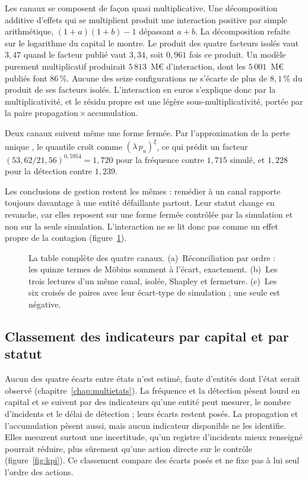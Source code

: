 Les canaux se composent de façon quasi multiplicative. Une décomposition additive d'effets qui se
multiplient produit une interaction positive par simple arithmétique, $(1+a)(1+b)-1$ dépassant $a+b$.
La décomposition refaite sur le logarithme du capital le montre. Le produit des quatre facteurs isolés
vaut $3{,}47$ quand le facteur publié vaut $3{,}34$, soit $0{,}961$ fois ce produit. Un modèle
purement multiplicatif produirait $5\,813$~M\euro{} d'interaction, dont les $5\,001$~M\euro{} publiés
font $86\,\%$. Aucune des seize configurations ne s'écarte de plus de $8{,}1\,\%$ du produit de ses
facteurs isolés. L'interaction en euros s'explique donc par la multiplicativité, et le résidu propre est
une légère sous-multiplicativité, portée par la paire propagation\,$\times$\,accumulation.

Deux canaux suivent même une forme fermée. Par l'approximation de la perte unique \citep{bockerkluppelberg2005}, le
quantile croît comme $(\lambda\,p_u)^{\xi}$, ce qui prédit un facteur
$(53{,}62/21{,}56)^{0{,}5954}=1{,}720$ pour la fréquence contre $1{,}715$ simulé, et $1{,}228$ pour la
détection contre $1{,}239$.

Les conclusions de gestion restent les mêmes : remédier à un canal rapporte toujours davantage à
une entité défaillante partout. Leur statut change en revanche, car elles reposent sur une forme
fermée contrôlée par la simulation et non sur la seule simulation. L'interaction ne se lit donc pas
comme un effet propre de la contagion (figure~\ref{fig:interaction-canaux}).

\begin{figure}[H]\centering
{}
\caption{La table complète des quatre canaux. (a)~Réconciliation par ordre : les quinze termes de
Möbius somment à l'écart, exactement. (b)~Les trois lectures d'un même canal, isolée, Shapley et
fermeture. (c)~Les six croisés de paires avec leur écart-type de simulation ; une seule est négative.}
\label{fig:interaction-canaux}
\end{figure}

\subsection{Classement des indicateurs par capital et par statut}

Aucun des quatre écarts entre états n'est estimé, faute d'entités dont l'état serait observé
(chapitre~\ref{chap:multietats}). La fréquence et la détection pèsent lourd en
capital et se suivent par des indicateurs qu'une entité peut mesurer, le nombre d'incidents et le délai de
détection ; leurs écarts restent posés. La propagation et l'accumulation pèsent aussi, mais aucun indicateur
disponible ne les identifie. Elles mesurent surtout une incertitude, qu'un registre d'incidents mieux renseigné
pourrait réduire, plus sûrement qu'une action directe sur le contrôle (figure~\ref{fig:kpi}). Ce classement
compare des écarts posés et ne fixe pas à lui seul l'ordre des actions.

